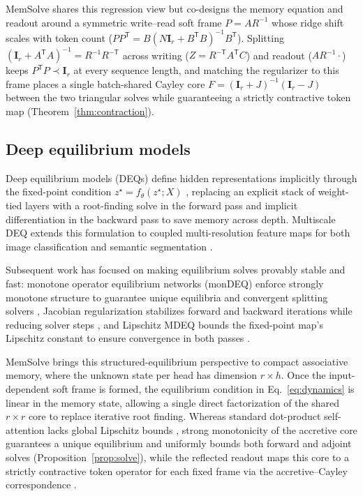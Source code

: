 \documentclass[10pt,twocolumn]{article}
\newcommand{\I}{\mathbf{I}}
\newcommand{\T}{\mathsf{T}}
\begin{document}
MemSolve shares this regression view but co-designs the memory equation and
readout around a symmetric write--read soft frame $P=AR^{-1}$ whose ridge
shift scales with token count ($PP^\T=B(N\I_r+B^\T B)^{-1}B^\T$).
Splitting $(\I_r+A^\T A)^{-1}=R^{-1}R^{-\T}$ across writing ($Z=R^{-\T}A^\T C$)
and readout ($AR^{-1}\cdot$) keeps $P^\T P\prec\I_r$ at every sequence length,
and matching the regularizer to this frame places a single batch-shared
Cayley core $F=(\I_r+J)^{-1}(\I_r-J)$ between the two triangular solves while
guaranteeing a strictly contractive token map (Theorem~\ref{thm:contraction}).

\subsection{Deep equilibrium models}
\label{app:deq}

Deep equilibrium models (DEQs) define hidden representations implicitly
through the fixed-point condition $z^\star=f_\theta(z^\star;X)$
\cite{bai2019deep}, replacing an explicit stack of weight-tied layers with a
root-finding solve in the forward pass and implicit differentiation in the
backward pass to save memory across depth.
Multiscale DEQ extends this formulation to coupled multi-resolution feature
maps for both image classification and semantic segmentation
\cite{bai2020multiscale}.

Subsequent work has focused on making equilibrium solves provably stable and
fast: monotone operator equilibrium networks (monDEQ) enforce strongly
monotone structure to guarantee unique equilibria and convergent splitting
solvers \cite{winston2020mondeq}, Jacobian regularization stabilizes forward
and backward iterations while reducing solver steps \cite{bai2021stabilizing},
and Lipschitz MDEQ bounds the fixed-point map's Lipschitz constant to ensure
convergence in both passes \cite{sato2026lipschitz}.

MemSolve brings this structured-equilibrium perspective to compact associative
memory, where the unknown state per head has dimension $r\times h$.
Once the input-dependent soft frame is formed, the equilibrium condition in
Eq.~\eqref{eq:dynamics} is linear in the memory state, allowing a single direct
factorization of the shared $r\times r$ core to replace iterative root
finding.
Whereas standard dot-product self-attention lacks global Lipschitz bounds
\cite{kim2021lipschitz}, strong monotonicity of the accretive core guarantees a
unique equilibrium and uniformly bounds both forward and adjoint solves
(Proposition~\ref{prop:solve}), while the reflected readout maps this core to a
strictly contractive token operator for each fixed frame via the
accretive--Cayley correspondence \cite{bauschke2017convex,wang2023direct}.
\end{document}
